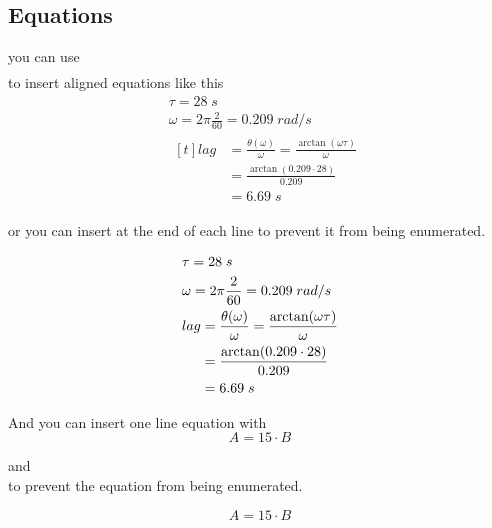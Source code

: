 \documentclass[12pt]{article}
\begin{document}
\subsection{Equations}
you can use \texttt{\begin{align} \end{align}} to insert aligned equations like this
\begin{align}
    & \tau = 28\;s \\
    & \omega = 2 \pi \frac{2}{60} = 0.209\;rad/s \\
    & \begin{aligned}[t]
                lag &= \frac{\theta (\omega)}{\omega} = \frac{\arctan (\omega \tau)}{\omega} \\
                &= \frac{\arctan (0.209 \cdot 28)}{0.209} \\ 
                &= 6.69\;s
       \end{aligned}
\end{align}

or you can insert \texttt{\notag} at the end of each line to prevent it from being enumerated.

\begin{align}
    & \tau = 28\;s \notag\\
    & \omega = 2 \pi \frac{2}{60} = 0.209\;rad/s \notag\\
    & \begin{aligned}[t]
                lag &= \frac{\theta (\omega)}{\omega} = \frac{\arctan (\omega \tau)}{\omega} \\
                &= \frac{\arctan (0.209 \cdot 28)}{0.209} \\ 
                &= 6.69\;s
       \end{aligned} \notag
\end{align}

And you can insert one line equation with \texttt{\begin{equation} \end{equation}}
\begin{equation}
    A = 15 \cdot B
\end{equation}

and \texttt{\begin{equation*} \end{equation*}} to prevent the equation from being enumerated.

\begin{equation*}
    A = 15 \cdot B
\end{equation*}
\end{document}
